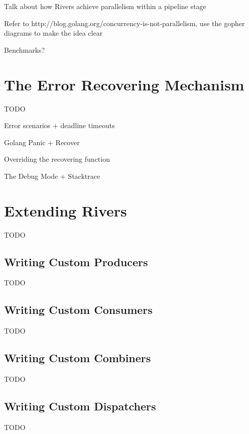 Talk about how Rivers achieve parallelism within a pipeline stage

Refer to http://blog.golang.org/concurrency-is-not-parallelism, use the gopher diagrams to make the idea clear

Benchmarks?

\section{The Error Recovering Mechanism}
\label{sec:recovering_mechanism}

TODO

Error scenarios + deadline timeouts

Golang Panic + Recover

Overriding the recovering function

The Debug Mode + Stacktrace

\section{Extending Rivers}
\label{sec:extending_rivers}

TODO

\subsection{Writing Custom Producers}
\label{sec:custom_producers}

TODO

\subsection{Writing Custom Consumers}
\label{sec:custom_consumers}

TODO

\subsection{Writing Custom Combiners}
\label{sec:custom_combiners}

TODO

\subsection{Writing Custom Dispatchers}
\label{sec:custom_dispatchers}

TODO
